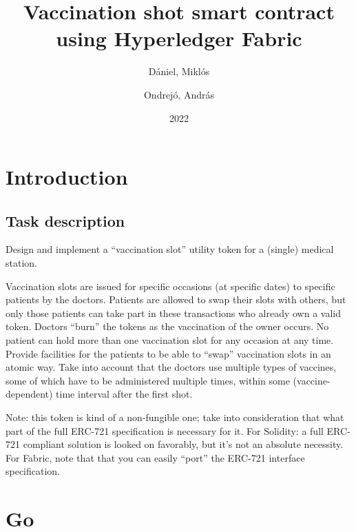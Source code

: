 \documentclass{article}
\author{
  Dániel, Miklós\\
  \IfFileExists{DM.txt}{
    \texttt{
        \begingroup
            \obeylines
            
        \endgroup
            }
  }{}  
  \and
  Ondrejó, András\\
  \IfFileExists{OA.txt}{
    \texttt{
        \begingroup
            \obeylines
            
        \endgroup
            }
  }{}  
}
\title{Vaccination shot smart contract using Hyperledger Fabric}
\date{2022}
\begin{document}
\maketitle
\newpage
\tableofcontents
\newpage
\section{Introduction}
\subsection{Task description}
Design and implement a “vaccination slot” utility token for a (single) medical station.\par
Vaccination slots are issued for specific occasions (at specific dates) to specific patients by the doctors. Patients are allowed to swap their slots with others, but only those patients can take part in these transactions who already own a valid token. Doctors “burn” the tokens as the vaccination of the owner occurs. No patient can hold more than one vaccination slot for any occasion at any time. Provide facilities for the patients to be able to “swap” vaccination slots in an atomic way. Take into account that the doctors use multiple types of vaccines, some of which have to be administered multiple times, within some (vaccine-dependent) time interval after the first shot.\par
Note: this token is kind of a non-fungible one; take into consideration that what part of the full ERC-721 specification is necessary for it. For Solidity: a full ERC-721 compliant solution is looked on favorably, but it's not an absolute necessity. For Fabric, note that that you can easily “port” the ERC-721 interface specification.

\section{Go}
\end{document}
